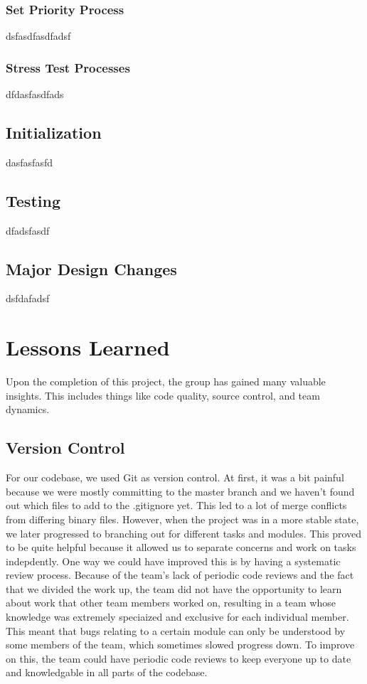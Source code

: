 \documentclass[12pt]{report}
\begin{document}
\subsection{Set Priority Process}

dsfasdfasdfadsf

\subsection{Stress Test Processes}

dfdasfasdfads

\section{Initialization}

dasfasfasfd

\section{Testing}

dfadsfasdf

\section{Major Design Changes}

dsfdafadsf

\chapter{Lessons Learned}

Upon the completion of this project, the group has gained many valuable insights. This includes things like code quality, source control, and team dynamics.

\section{Version Control}
For our codebase, we used Git as version control. At first, it was a bit painful because we were mostly committing to the master branch and we haven't found out which files to add to the .gitignore yet. This led to a lot of merge conflicts from differing binary files.
However, when the project was in a more stable state, we later progressed to branching out for different tasks and modules. This proved to be quite helpful because it allowed us to separate concerns and work on tasks indepdently.
One way we could have improved this is by having a systematic review process. Because of the team's lack of periodic code reviews and the fact that we divided the work up, the team did not have the opportunity to learn about work that other team members worked on, resulting in a team whose knowledge was extremely speciaized and exclusive for each individual member. This meant that bugs relating to a certain module can only be understood by some members of the team, which sometimes slowed progress down. To improve on this, the team could have periodic code reviews to keep everyone up to date and knowledgable in all parts of the codebase.
\end{document}

